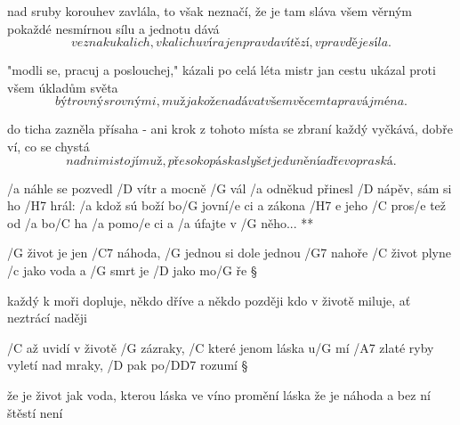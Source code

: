 nad sruby korouhev zavlála, to však neznačí, že je tam sláva
všem věrným pokaždé nesmírnou sílu a jednotu dává
\[ ve znaku kalich, v kalichu víra
jen pravda vítězí, v pravdě je síla. \] \s

"modli se, pracuj a poslouchej," kázali po celá léta
mistr jan cestu ukázal proti všem úkladům světa
\[ být rovný s rovnými, muž jako žena
dávat všem věcem ta pravá jména. \] \s

do ticha zazněla přísaha - ani krok z tohoto místa
se zbraní každý vyčkává, dobře ví, co se chystá
\[ nad nimi stojí muž, přes oko páska
slyšet je dunění a dřevo praská. \]

\R  /a náhle se pozvedl /D vítr a mocně /G vál
    /a odněkud přinesl /D nápěv, sám si ho /H7 hrál:
    /a kdož sú boží bo/G jovní/e ci a zákona /{H7 e} jeho
    /C pros/e tež od /a bo/C ha /a pomo/e ci a /a úfajte v /G něho... **




/G život je jen /C7 náhoda, /G jednou si dole jednou /G7 nahoře
/C život plyne /c jako voda a /G smrt je /D jako mo/G ře \S

každý k moři dopluje, někdo dříve a někdo později
kdo v životě miluje, ať neztrácí naději \s

/C až uvidí v životě /G zázraky, /C které jenom láska u/G mí
/A7 zlaté ryby vyletí nad mraky, /D pak po/{D\dim D7} rozumí \S

že je život jak voda, kterou láska ve víno promění
láska že je náhoda a bez ní štěstí není



\bye
